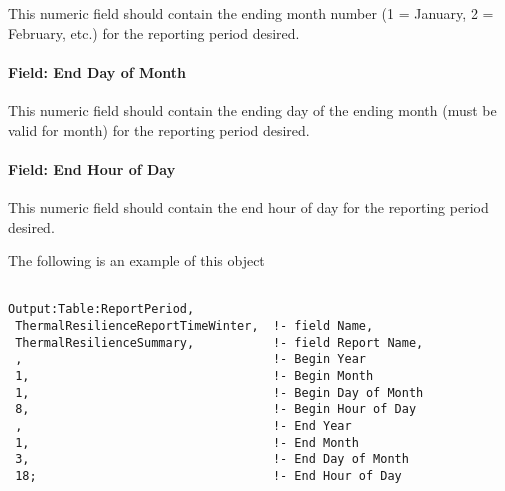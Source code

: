 This numeric field should contain the ending month number (1 = January, 2 =
February, etc.) for the reporting period desired.

\paragraph{Field: End Day of Month}\label{field-end-day-of-month-3}

This numeric field should contain the ending day of the ending month (must be
valid for month) for the reporting period desired.

\paragraph{Field: End Hour of Day}\label{field-end-hour-of-day}

This numeric field should contain the end hour of day for the reporting period
desired.

The following is an example of this object

\begin{lstlisting}

Output:Table:ReportPeriod,
 ThermalResilienceReportTimeWinter,  !- field Name,
 ThermalResilienceSummary,           !- field Report Name,
 ,                                   !- Begin Year
 1,                                  !- Begin Month
 1,                                  !- Begin Day of Month
 8,                                  !- Begin Hour of Day
 ,                                   !- End Year
 1,                                  !- End Month
 3,                                  !- End Day of Month
 18;                                 !- End Hour of Day

\end{lstlisting}
